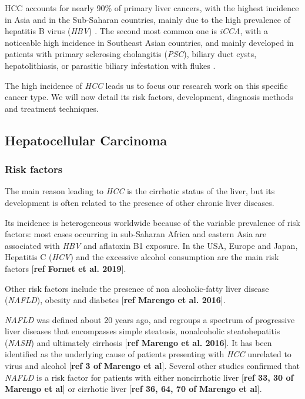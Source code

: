 \documentclass[]{article}
\begin{document}
HCC accounts for nearly 90\% of primary liver cancers, with the highest
incidence in Asia and in the Sub-Saharan countries, mainly due to the
high prevalence of hepatitis B virus (\emph{HBV}) \cite{Sia2017, Torre2015}. The second most common one is \emph{iCCA}, with a
noticeable high incidence in Southeast Asian countries, and mainly
developed in patients with primary sclerosing cholangitis (\emph{PSC}),
biliary duct cysts, hepatolithiasis, or parasitic biliary infestation
with flukes \cite{Sia2017, Bridgewater2014}.

The high incidence of \emph{HCC} leads us to focus our research work on
this specific cancer type. We will now detail its risk factors,
development, diagnosis methods and treatment techniques.

\subsection*{Hepatocellular Carcinoma}\label{hepatocellular-carcinoma}

\subsubsection*{Risk factors}\label{risk-factors}

The main reason leading to \emph{HCC} is the cirrhotic status of the
liver, but its development is often related to the presence of other
chronic liver diseases.

Its incidence is heterogeneous worldwide because of the variable
prevalence of risk factors: most cases occurring in sub-Saharan Africa
and eastern Asia are associated with \emph{HBV} and aflatoxin B1
exposure. In the USA, Europe and Japan, Hepatitis C (\emph{HCV}) and the
excessive alcohol consumption are the main risk factors {[}\textbf{ref
Fornet et al. 2019}{]}.

Other risk factors include the presence of non alcoholic-fatty liver
disease (\emph{NAFLD}), obesity and diabetes {[}\textbf{ref Marengo et
al. 2016}{]}.

\emph{NAFLD} was defined about 20 years ago, and regroups a spectrum of
progressive liver diseases that encompasses simple steatosis,
nonalcoholic steatohepatitis (\emph{NASH}) and ultimately cirrhosis
{[}\textbf{ref Marengo et al. 2016}{]}. It has been identified as the
underlying cause of patients presenting with \emph{HCC} unrelated to
virus and alcohol {[}\textbf{ref 3 of} \textbf{Marengo et al}{]}.
Several other studies confirmed that \emph{NAFLD} is a risk factor for
patients with either noncirrhotic liver {[}\textbf{ref 33, 30 of}
\textbf{Marengo et al}{]} or cirrhotic liver {[}\textbf{ref 36, 64, 70
of} \textbf{Marengo et al}{]}.
\end{document}
